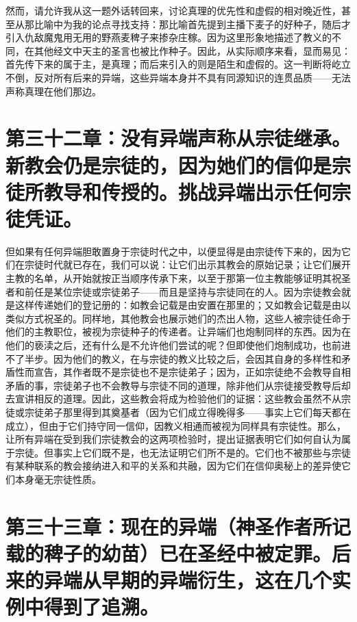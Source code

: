 然而，请允许我从这一题外话转回来，讨论真理的优先性和虚假的相对晚近性，甚至从那比喻中为我的论点寻找支持：那比喻首先提到主播下麦子的好种子，随后才引入仇敌魔鬼用无用的野燕麦稗子来掺杂庄稼。因为这里形象地描述了教义的不同，在其他经文中天主的圣言也被比作种子。因此，从实际顺序来看，显而易见：首先传下来的属于主，是真理；而后来引入的则是陌生和虚假的。这一判断将屹立不倒，反对所有后来的异端，这些异端本身并不具有同源知识的连贯品质——无法声称真理在他们那边。\par


\section{第三十二章：没有异端声称从宗徒继承。新教会仍是宗徒的，因为她们的信仰是宗徒所教导和传授的。挑战异端出示任何宗徒凭证。}

但如果有任何异端胆敢置身于宗徒时代之中，以便显得是由宗徒传下来的，因为它们在宗徒时代就已存在，我们可以说：让它们出示其教会的原始记录；让它们展开主教的名单，从开始就按正当顺序传承下来，以至于那第一位主教能够证明其祝圣者和前任是某位宗徒或宗徒弟子——而且是坚持与宗徒同在的人。因为宗徒教会就是这样传递她们的登记册的：如教会记载是由安置在那里的；又如教会记载是由以类似方式祝圣的。同样地，其他教会也展示她们的杰出人物，这些人被宗徒任命于他们的主教职位，被视为宗徒种子的传递者。让异端们也炮制同样的东西。因为在他们的亵渎之后，还有什么是不允许他们尝试的呢？但即使他们炮制成功，也前进不了半步。因为他们的教义，在与宗徒的教义比较之后，会因其自身的多样性和矛盾性而宣告，其作者既不是宗徒也不是宗徒弟子；因为，正如宗徒绝不会教导自相矛盾的事，宗徒弟子也不会教导与宗徒不同的道理，除非他们从宗徒接受教导后却去宣讲相反的道理。因此，这些教会将成为检验他们的证据：这些教会虽然不从宗徒或宗徒弟子那里得到其奠基者（因为它们成立得晚得多——事实上它们每天都在成立），但由于它们持守同一信仰，因教义相通而被视为同样具有宗徒性。那么，让所有异端在受到我们宗徒教会的这两项检验时，提出证据表明它们如何自认为属于宗徒。但事实上它们既不是，也无法证明它们所不是的。它们也不被那些与宗徒有某种联系的教会接纳进入和平的关系和共融，因为它们在信仰奥秘上的差异使它们本身毫无宗徒性质。\par


\section{第三十三章：现在的异端（神圣作者所记载的稗子的幼苗）已在圣经中被定罪。后来的异端从早期的异端衍生，这在几个实例中得到了追溯。}

